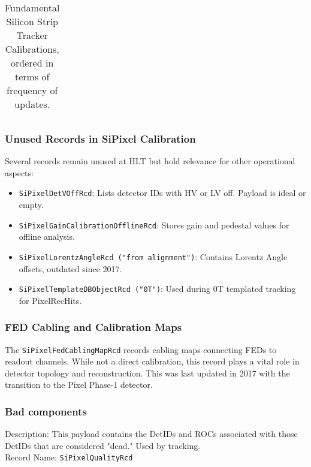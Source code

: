\begin{table}[h!]
\begin{adjustbox}{max width=\textwidth}
\begin{tabular}{p{2.5cm}|p{5.7cm}|p{1.5cm}|p{2.5cm}|p{3.0cm}}
    \end{tabular}
    \end{adjustbox}
    \caption{Fundamental Silicon Strip Tracker Calibrations, ordered in terms of frequency of updates.}
    \label{tab:PixelCalibrations_critical}
\end{table}

\subsubsection{Unused Records in SiPixel Calibration}
Several records remain unused at HLT but hold relevance for other operational aspects:
\begin{itemize}
    \item \texttt{SiPixelDetVOffRcd}: Lists detector IDs with HV or LV off. Payload is ideal or empty.
    \item \texttt{SiPixelGainCalibrationOfflineRcd}: Stores gain and pedestal values for offline analysis.
    \item \texttt{SiPixelLorentzAngleRcd ("from alignment")}: Contains Lorentz Angle offsets, outdated since 2017.
    \item \texttt{SiPixelTemplateDBObjectRcd ("0T")}: Used during 0T templated tracking for PixelRecHits.
\end{itemize}

\subsubsection{FED Cabling and Calibration Maps}
The \texttt{SiPixelFedCablingMapRcd} records cabling maps connecting FEDs to readout channels. While not a direct calibration, this record plays a vital role in detector topology and reconstruction. This was last updated in 2017 with the transition to the Pixel Phase-1 detector.

\subsubsection{Bad components}
Description: This payload contains the DetIDs and ROCs associated with those DetIDs that are considered "dead." Used by tracking.\\
Record Name: \texttt{SiPixelQualityRcd} 

